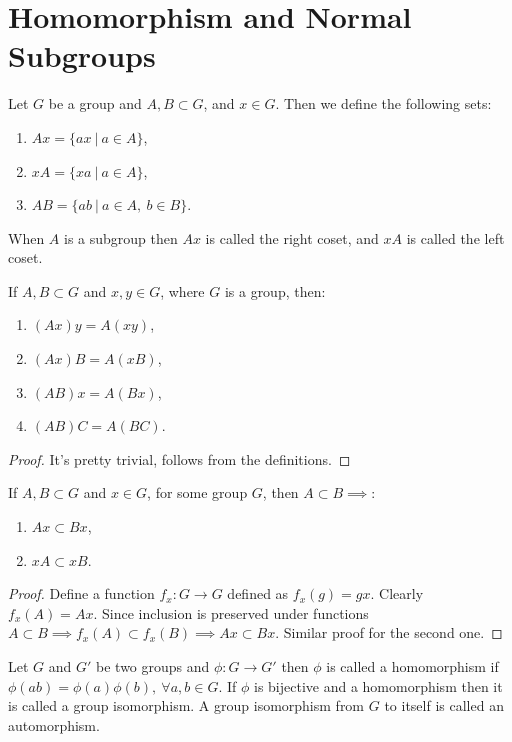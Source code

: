 \section{Homomorphism and Normal Subgroups}
\begin{definition}
  Let $G$ be a group and $A,B\subset G$, and $x\in G$. Then we define the following sets:
  \begin{enumerate}
    \item $Ax = \{ax\ |\ a\in A\}$,
    \item $xA = \{xa\ |\ a\in A\}$,
    \item $AB = \{ab\ |\ a\in A,\ b\in B\}$.
  \end{enumerate}
  When $A$ is a subgroup then $Ax$ is called the right coset, and $xA$ is called the left coset.
\end{definition}
\begin{proposition}
  If $A,B\subset G$ and $x,y\in G$, where $G$ is a group, then:
  \begin{enumerate}
    \item $(Ax)y = A(xy)$,
    \item $(Ax)B = A(xB)$,
    \item $(AB)x = A(Bx)$,
    \item $(AB)C = A(BC)$.
  \end{enumerate}
\end{proposition}
\begin{proof}
  It's pretty trivial, follows from the definitions.
\end{proof}
\begin{proposition}
  If $A,B\subset G$ and $x\in G$, for some group $G$, then $A\subset B \implies$:
  \begin{enumerate}
    \item $Ax \subset Bx$,
    \item $xA \subset xB$.
  \end{enumerate}
\end{proposition}
\begin{proof}
  Define a function $f_x:G\to G$ defined as $f_x(g) = gx$. Clearly $f_x(A) = Ax$. Since inclusion is preserved under functions $A\subset B \implies f_x(A) \subset f_x(B) \implies Ax \subset Bx$. Similar proof for the second one.
\end{proof}
\begin{definition}
  Let $G$ and $G'$ be two groups and $\phi: G\to G'$ then $\phi$ is called a homomorphism if $\phi(ab) = \phi(a)\phi(b),\ \forall a,b\in G$. If $\phi$ is bijective and a homomorphism then it is called a group isomorphism. A group isomorphism from $G$ to itself is called an automorphism.
\end{definition}
